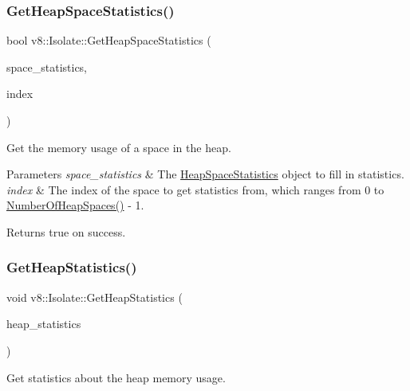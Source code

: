 \subsubsection{\texorpdfstring{Get\+Heap\+Space\+Statistics()}{GetHeapSpaceStatistics()}}
{\footnotesize\ttfamily bool v8\+::\+Isolate\+::\+Get\+Heap\+Space\+Statistics (\begin{DoxyParamCaption}\item[{\mbox{\hyperlink{classv8_1_1HeapSpaceStatistics}{Heap\+Space\+Statistics}} $\ast$}]{space\+\_\+statistics,  }\item[{size\+\_\+t}]{index }\end{DoxyParamCaption})}

Get the memory usage of a space in the heap.


\begin{DoxyParams}{Parameters}
{\em space\+\_\+statistics} & The \mbox{\hyperlink{classv8_1_1HeapSpaceStatistics}{Heap\+Space\+Statistics}} object to fill in statistics. \\
\hline
{\em index} & The index of the space to get statistics from, which ranges from 0 to \mbox{\hyperlink{classv8_1_1Isolate_ad948acf0892e677a95fbc743b63ca5fa}{Number\+Of\+Heap\+Spaces()}} -\/ 1. \\
\hline
\end{DoxyParams}
\begin{DoxyReturn}{Returns}
true on success. 
\end{DoxyReturn}
\mbox{\label{classv8_1_1Isolate_add32e78544edaf8946ed9b328167e5e4}} 
\subsubsection{\texorpdfstring{Get\+Heap\+Statistics()}{GetHeapStatistics()}}
{\footnotesize\ttfamily void v8\+::\+Isolate\+::\+Get\+Heap\+Statistics (\begin{DoxyParamCaption}\item[{\mbox{\hyperlink{classv8_1_1HeapStatistics}{Heap\+Statistics}} $\ast$}]{heap\+\_\+statistics }\end{DoxyParamCaption})}

Get statistics about the heap memory usage. \mbox{\label{classv8_1_1Isolate_a7b5e27afbee07768d094e28e7a4c5a33}} 
